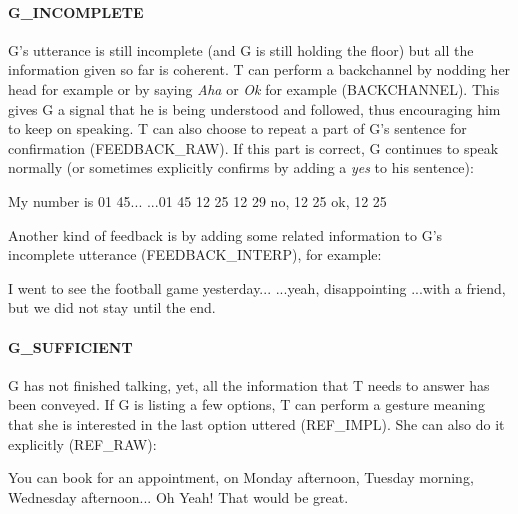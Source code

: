 					\paragraph{G\_INCOMPLETE} G's utterance is still incomplete (and G is still holding the floor) but all the information given so far is coherent. T can perform a backchannel by nodding her head for example or by saying \textit{Aha} or \textit{Ok} for example (BACKCHANNEL). This gives G a signal that he is being understood and followed, thus encouraging him to keep on speaking. T can also choose to repeat a part of G's sentence for confirmation (FEEDBACK\_RAW). If this part is correct, G continues to speak normally (or sometimes explicitly confirms by adding a \textit{yes} to his sentence):
					
						\begin{dialogue}
							 My number is 01 45...
							 ...01 45
							 12 25
							 12 29
							 no, 12 25
							 ok, 12 25
						\end{dialogue}
						
						Another kind of feedback is by adding some related information to G's incomplete utterance (FEEDBACK\_INTERP), for example:
						
						\begin{dialogue}
							 I went to see the football game yesterday...
							 ...yeah, disappointing
							 ...with a friend, but we did not stay until the end.
						\end{dialogue}
                        
                   	\paragraph{G\_SUFFICIENT} G has not finished talking, yet, all the information that T needs to answer has been conveyed. If G is listing a few options, T can perform a gesture meaning that she is interested in the last option uttered (REF\_IMPL). She can also do it explicitly (REF\_RAW):
                    
                    	\begin{dialogue}
							 You can book for an appointment, on Monday afternoon, Tuesday morning, Wednesday afternoon...
							 Oh Yeah! That would be great.
						\end{dialogue}
                        

